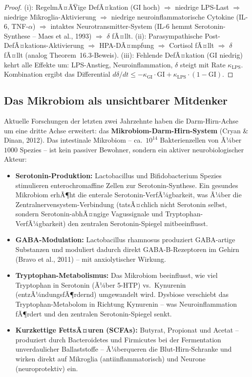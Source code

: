 ﻿\documentclass[12pt,a4paper]{report}
\theoremstyle{plain}
\theoremstyle{definition}
\theoremstyle{remark}
\begin{document}
	\begin{proof}
		(i):
		RegelmÃ¤ÃŸige DefÃ¤kation ($\mathrm{GI}$ hoch) $\Rightarrow$
		niedrige LPS-Last $\Rightarrow$ niedrige Mikroglia-Aktivierung
		$\Rightarrow$ niedrige neuroinflammatorische Cytokine (IL-6, TNF-$\alpha$)
		$\Rightarrow$ intaktes Neuro\-transmitter-System (IL-6 hemmt
		Serotonin-Synthese -- Maes et al., 1993) $\Rightarrow$ $\delta$ fÃ¤llt.
		(ii): Parasympathische Post-DefÃ¤kations-Aktivierung $\Rightarrow$
		HPA-DÃ¤mpfung $\Rightarrow$ Cortisol fÃ¤llt $\Rightarrow$ $\delta$ fÃ¤llt
		(analog Theorem~16.3-Beweis).
		(iii): Fehlende DefÃ¤kation ($\mathrm{GI}$ niedrig) kehrt alle Effekte um:
		LPS-Anstieg, Neuroinflammation, $\delta$ steigt mit Rate $\kappa_{\mathrm{LPS}}$.
		Kombination ergibt das Differential $d\delta/dt\leq -\kappa_{\mathrm{GI}}\cdot\mathrm{GI} + \kappa_{\mathrm{LPS}}\cdot(1-\mathrm{GI})$. \hfill
	\end{proof}

	\subsection{Das Mikrobiom als unsichtbarer Mitdenker}

	Aktuelle Forschungen der letzten zwei Jahrzehnte haben die
	Darm-Hirn-Achse um eine dritte Achse erweitert:
	das \textbf{Mikrobiom-Darm-Hirn-System} (Cryan \& Dinan, 2012).
	Das intestinale Mikrobiom -- ca.\ $10^{14}$ Bakterienzellen
	von Ã¼ber $1000$ Spezies -- ist kein passiver Bewohner,
	sondern ein aktiver neurobiologischer Akteur:

	\begin{itemize}
		\item \textbf{Serotonin-Produktion:}
		Lactobacillus und Bifidobacterium Spezies stimulieren
		enterochromaffine Zellen zur Serotonin-Synthese.
		Ein gesundes Mikrobiom erhÃ¶ht die enterale
		Serotonin-VerfÃ¼gbarkeit, was Ã¼ber die Zentralnervensystem-Verbindung
		(tatsÃ¤chlich nicht Serotonin selbst, sondern Serotonin-abhÃ¤ngige
		Vagussignale und Tryptophan-VerfÃ¼gbarkeit) den zentralen
		Serotonin-Spiegel mitbeeinflusst.
		\item \textbf{GABA-Modulation:}
		Lactobacillus rhamnosus produziert GABA-artige Substanzen
		und moduliert dadurch direkt GABA-B-Rezeptoren im Gehirn
		(Bravo et al., 2011) -- mit anxiolytischer Wirkung.
		\item \textbf{Tryptophan-Metabolismus:}
		Das Mikrobiom beeinflusst, wie viel Tryptophan in Serotonin
		(Ã¼ber 5-HTP) vs.\ Kynurenin (entzÃ¼ndungsfÃ¶rdernd)
		umgewandelt wird. Dysbiose verschiebt das Tryptophan-Metabolom
		in Richtung Kynurenin -- was Neuroinflammation fÃ¶rdert und
		den zentralen Serotonin-Spiegel senkt.
		\item \textbf{Kurzkettige FettsÃ¤uren (SCFAs):}
		Butyrat, Propionat und Acetat -- produziert durch
		Bacteroidetes und Firmicutes bei der Fermentation
		unverdaulicher Ballaststoffe -- Ã¼berqueren die Blut-Hirn-Schranke
		und wirken direkt auf Mikroglia (antiinflammatorisch) und
		Neurone (neuroprotektiv) ein.
	\end{itemize}
\end{document}
